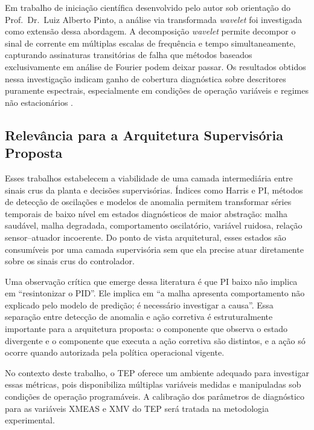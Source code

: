 Em trabalho de iniciação científica desenvolvido pelo autor sob orientação do Prof.\ Dr.\ Luiz Alberto Pinto, a análise via transformada \textit{wavelet} foi investigada como extensão dessa abordagem. A decomposição \textit{wavelet} permite decompor o sinal de corrente em múltiplas escalas de frequência e tempo simultaneamente, capturando assinaturas transitórias de falha que métodos baseados exclusivamente em análise de Fourier podem deixar passar. Os resultados obtidos nessa investigação indicam ganho de cobertura diagnóstica sobre descritores puramente espectrais, especialmente em condições de operação variáveis e regimes não estacionários \cite{Lessmeier2016}.

\subsection{Relevância para a Arquitetura Supervisória Proposta}

Esses trabalhos estabelecem a viabilidade de uma camada intermediária entre sinais crus da planta e decisões supervisórias. Índices como Harris e PI, métodos de detecção de oscilações e modelos de anomalia permitem transformar séries temporais de baixo nível em estados diagnósticos de maior abstração: malha saudável, malha degradada, comportamento oscilatório, variável ruidosa, relação sensor--atuador incoerente. Do ponto de vista arquitetural, esses estados são consumíveis por uma camada supervisória sem que ela precise atuar diretamente sobre os sinais crus do controlador.

Uma observação crítica que emerge dessa literatura é que PI baixo não implica em ``resintonizar o PID''. Ele implica em ``a malha apresenta comportamento não explicado pelo modelo de predição; é necessário investigar a causa''. Essa separação entre detecção de anomalia e ação corretiva é estruturalmente importante para a arquitetura proposta: o componente que observa o estado divergente e o componente que executa a ação corretiva são distintos, e a ação só ocorre quando autorizada pela política operacional vigente.

No contexto deste trabalho, o TEP oferece um ambiente adequado para investigar essas métricas, pois disponibiliza múltiplas variáveis medidas e manipuladas sob condições de operação programáveis. A calibração dos parâmetros de diagnóstico para as variáveis XMEAS e XMV do TEP será tratada na metodologia experimental.


